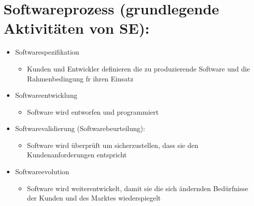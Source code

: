 \section{Softwareprozess (grundlegende Aktivitäten von SE):}
\begin{itemize}
    \item Softwarespezifikation
    \begin{itemize}
        \item Kunden und Entwickler definieren die zu produzierende Software und die Rahmenbedingung fr ihren Einsatz
    \end{itemize}
    \item Softwareentwicklung
    \begin{itemize}
        \item Software wird entworfen und programmiert
    \end{itemize}
    \item Softwarevalidierung (Softwarebeurteilung):
    \begin{itemize}
        \item Software wird überprüft um sicherzustellen, dass sie den Kundenanforderungen entspricht
    \end{itemize}
    \item Softwareevolution
    \begin{itemize}
        \item Software wird weiterentwickelt, damit sie die sich ändernden Bedürfnisse der Kunden und des Marktes wiederspiegelt
    \end{itemize}
\end{itemize}

